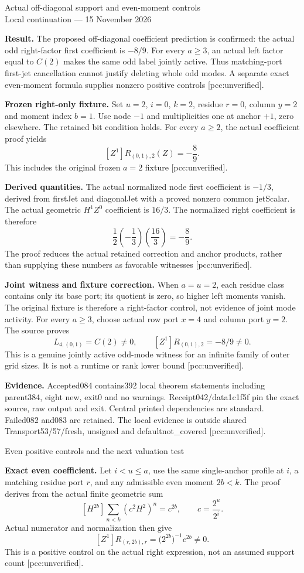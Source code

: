 \documentclass[10pt]{article}
\begin{document}
\begin{center}{\Large Actual off-diagonal support and even-moment controls}\\[4pt]
Local continuation --- 15 November 2026\end{center}
\textbf{Result.} The proposed off-diagonal coefficient prediction is confirmed:
the actual odd right-factor first coefficient is $-8/9$. For every $a\ge3$,
an actual left factor equal to $C(2)$ makes the same odd label jointly active.
Thus matching-port first-jet cancellation cannot justify deleting whole odd
modes. A separate exact even-moment formula supplies nonzero positive controls
[pcc:unverified].

\textbf{Frozen right-only fixture.} Set $u=2$, $i=0$, $k=2$, residue $r=0$,
column $y=2$ and moment index $b=1$. Use node $-1$ and multiplicities one at
anchor $+1$, zero elsewhere. The retained bit condition holds. For every
$a\ge2$, the actual coefficient proof yields
\[
 [Z^1]R_{(0,1),2}(Z)=-\frac89.
\]
This includes the original frozen $a=2$ fixture [pcc:unverified].

\textbf{Derived quantities.} The actual normalized node first coefficient is
$-1/3$, derived from firstJet and diagonalJet with a proved nonzero common
jetScalar. The actual geometric $H^1Z^0$ coefficient is $16/3$. The normalized
right coefficient is therefore
\[
 \frac12\left(-\frac13\right)\left(\frac{16}{3}\right)=-\frac89.
\]
The proof reduces the actual retained correction and anchor products, rather
than supplying these numbers as favorable witnesses [pcc:unverified].

\textbf{Joint witness and fixture correction.} When $a=u=2$, each residue
class contains only its base port; its quotient is zero, so higher left
moments vanish. The original fixture is therefore a right-factor control,
not evidence of joint mode activity. For every $a\ge3$, choose actual row
port $x=4$ and column port $y=2$. The source proves
\[
 L_{4,(0,1)}=C(2)\ne0,\qquad
 [Z^1]R_{(0,1),2}=-8/9\ne0.
\]
This is a genuine jointly active odd-mode witness for an infinite family of
outer grid sizes. It is not a runtime or rank lower bound
[pcc:unverified].

\textbf{Evidence.} Accepted084 contains392 local theorem statements including
parent384, eight new, exit0 and no warnings. Receipt042/data1c1f5f pin the exact
source, raw output and exit. Central printed dependencies are standard.
Failed082 and083 are retained. The local evidence is outside shared
Transport53/57/fresh, unsigned and defaultnot\_covered [pcc:unverified].
\newpage
\begin{center}{\Large Even positive controls and the next valuation test}\end{center}
\textbf{Exact even coefficient.} Let $i<u\le a$, use the same single-anchor
profile at $i$, a matching residue port $r$, and any admissible even moment
$2b<k$. The proof derives from the actual finite geometric sum
\[
 [H^{2b}]\sum_{n<k}(c^2H^2)^n=c^{2b},\qquad
 c=\frac{2^u}{2^i}.
\]
Actual numerator and normalization then give
\[
 [Z^1]R_{(r,2b),r}=\bigl(2^{2b}\bigr)^{-1}c^{2b}\ne0.
\]
This is a positive control on the actual right expression, not an assumed
support count [pcc:unverified].
\end{document}
